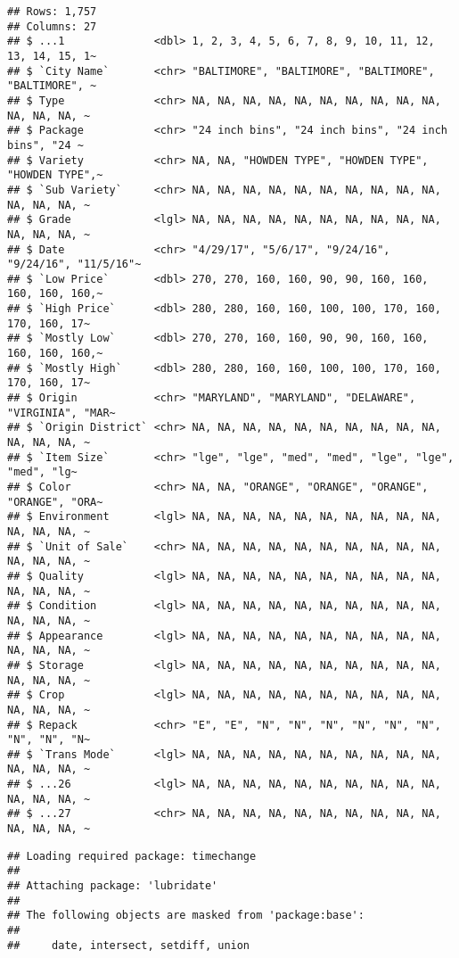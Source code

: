 \documentclass[
]{article}
\begin{document}
\begin{lstlisting}
## Rows: 1,757
## Columns: 27
## $ ...1              <dbl> 1, 2, 3, 4, 5, 6, 7, 8, 9, 10, 11, 12, 13, 14, 15, 1~
## $ `City Name`       <chr> "BALTIMORE", "BALTIMORE", "BALTIMORE", "BALTIMORE", ~
## $ Type              <chr> NA, NA, NA, NA, NA, NA, NA, NA, NA, NA, NA, NA, NA, ~
## $ Package           <chr> "24 inch bins", "24 inch bins", "24 inch bins", "24 ~
## $ Variety           <chr> NA, NA, "HOWDEN TYPE", "HOWDEN TYPE", "HOWDEN TYPE",~
## $ `Sub Variety`     <chr> NA, NA, NA, NA, NA, NA, NA, NA, NA, NA, NA, NA, NA, ~
## $ Grade             <lgl> NA, NA, NA, NA, NA, NA, NA, NA, NA, NA, NA, NA, NA, ~
## $ Date              <chr> "4/29/17", "5/6/17", "9/24/16", "9/24/16", "11/5/16"~
## $ `Low Price`       <dbl> 270, 270, 160, 160, 90, 90, 160, 160, 160, 160, 160,~
## $ `High Price`      <dbl> 280, 280, 160, 160, 100, 100, 170, 160, 170, 160, 17~
## $ `Mostly Low`      <dbl> 270, 270, 160, 160, 90, 90, 160, 160, 160, 160, 160,~
## $ `Mostly High`     <dbl> 280, 280, 160, 160, 100, 100, 170, 160, 170, 160, 17~
## $ Origin            <chr> "MARYLAND", "MARYLAND", "DELAWARE", "VIRGINIA", "MAR~
## $ `Origin District` <chr> NA, NA, NA, NA, NA, NA, NA, NA, NA, NA, NA, NA, NA, ~
## $ `Item Size`       <chr> "lge", "lge", "med", "med", "lge", "lge", "med", "lg~
## $ Color             <chr> NA, NA, "ORANGE", "ORANGE", "ORANGE", "ORANGE", "ORA~
## $ Environment       <lgl> NA, NA, NA, NA, NA, NA, NA, NA, NA, NA, NA, NA, NA, ~
## $ `Unit of Sale`    <chr> NA, NA, NA, NA, NA, NA, NA, NA, NA, NA, NA, NA, NA, ~
## $ Quality           <lgl> NA, NA, NA, NA, NA, NA, NA, NA, NA, NA, NA, NA, NA, ~
## $ Condition         <lgl> NA, NA, NA, NA, NA, NA, NA, NA, NA, NA, NA, NA, NA, ~
## $ Appearance        <lgl> NA, NA, NA, NA, NA, NA, NA, NA, NA, NA, NA, NA, NA, ~
## $ Storage           <lgl> NA, NA, NA, NA, NA, NA, NA, NA, NA, NA, NA, NA, NA, ~
## $ Crop              <lgl> NA, NA, NA, NA, NA, NA, NA, NA, NA, NA, NA, NA, NA, ~
## $ Repack            <chr> "E", "E", "N", "N", "N", "N", "N", "N", "N", "N", "N~
## $ `Trans Mode`      <lgl> NA, NA, NA, NA, NA, NA, NA, NA, NA, NA, NA, NA, NA, ~
## $ ...26             <lgl> NA, NA, NA, NA, NA, NA, NA, NA, NA, NA, NA, NA, NA, ~
## $ ...27             <chr> NA, NA, NA, NA, NA, NA, NA, NA, NA, NA, NA, NA, NA, ~
\end{lstlisting}

\begin{lstlisting}
## Loading required package: timechange
## 
## Attaching package: 'lubridate'
## 
## The following objects are masked from 'package:base':
## 
##     date, intersect, setdiff, union
\end{lstlisting}
\end{document}
